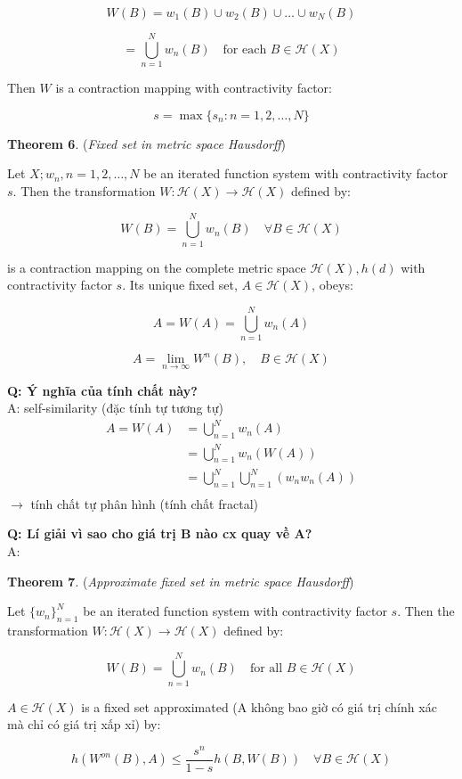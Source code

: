 \[
W(B) = w_1(B) \cup w_2(B) \cup \ldots \cup w_N(B)
\]

\[
= \bigcup_{n=1}^N w_n(B) \quad \text{for each } B \in \mathcal{H}(X)
\]

Then \(W\) is a contraction mapping with contractivity factor:

\[
s = \max\{s_n : n = 1, 2, \ldots, N\}
\]

\textbf{Theorem 6}. (\textit{Fixed set in metric space Hausdorff})

Let $X; w_n, n = 1,2, \ldots, N$ be an iterated function system with contractivity factor \(s\). Then the transformation \(W: \mathcal{H}(X) \rightarrow \mathcal{H}(X)\) defined by:

\[
W(B) = \bigcup_{n=1}^N w_n(B) \quad \forall B \in \mathcal{H}(X)
\]

is a contraction mapping on the complete metric space \(\mathcal{H}(X), h(d)\) with contractivity factor \(s\). Its unique fixed set, \(A \in \mathcal{H}(X)\), obeys:

\[
A = W(A) = \bigcup_{n=1}^N w_n(A)
\]

\[
A = \lim_{n \to \infty} W^n(B), \quad B \in \mathcal{H}(X)
\]

\textbf{Q: Ý nghĩa của tính chất này?}\\
A: self-similarity (đặc tính tự tương tự)
\begin{align*}
    A = W(A)
    &= \bigcup_{n=1}^N w_n(A)\\
    &= \bigcup_{n=1}^N w_n(W(A))\\
    &= \bigcup_{n=1}^N\bigcup_{n=1}^N (w_n w_n(A))\\
\end{align*}
$\rightarrow$ tính chất tự phân hình (tính chất fractal)

\textbf{Q: Lí giải vì sao cho giá trị B nào cx quay về A?}\\
A:

\textbf{Theorem 7}. (\textit{Approximate fixed set in metric space Hausdorff})

Let \(\{w_n\}_{n=1}^N\) be an iterated function system with contractivity factor \(s\). Then the transformation \(W: \mathcal{H}(X) \rightarrow \mathcal{H}(X)\) defined by:

\[
W(B) = \bigcup_{n=1}^N w_n(B) \quad \text{for all } B \in \mathcal{H}(X)
\]

\(A \in \mathcal{H}(X)\) is a fixed set approximated (A không bao giờ có giá trị chính xác mà chỉ có giá trị xấp xỉ) by:

\[
h(W^{on}(B), A) \leq \frac{s^n}{1 - s} h(B, W(B)) \quad \forall B \in \mathcal{H}(X)
\]


